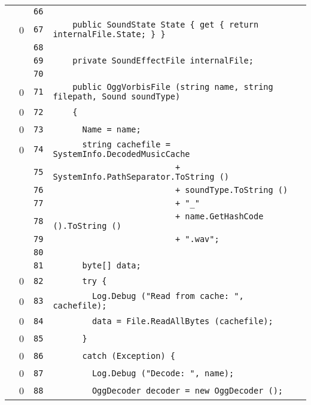 \documentclass[a4paper,10pt]{article}
\begin{document}
\begin{longtable}[l]{lrrl}
\cellcolor{gray} &  & \verb~66~ & \verb~~\\
\cellcolor{red} & 0 & \verb~67~ & \verb~    public SoundState State { get { return internalFile.State; } }~\\
\cellcolor{gray} &  & \verb~68~ & \verb~~\\
\cellcolor{gray} &  & \verb~69~ & \verb~    private SoundEffectFile internalFile;~\\
\cellcolor{gray} &  & \verb~70~ & \verb~~\\
\cellcolor{red} & 0 & \verb~71~ & \verb~    public OggVorbisFile (string name, string filepath, Sound soundType)~\\
\cellcolor{red} & 0 & \verb~72~ & \verb~    {~\\
\cellcolor{red} & 0 & \verb~73~ & \verb~      Name = name;~\\
\cellcolor{red} & 0 & \verb~74~ & \verb~      string cachefile = SystemInfo.DecodedMusicCache~\\
\cellcolor{gray} &  & \verb~75~ & \verb~                         + SystemInfo.PathSeparator.ToString ()~\\
\cellcolor{gray} &  & \verb~76~ & \verb~                         + soundType.ToString ()~\\
\cellcolor{gray} &  & \verb~77~ & \verb~                         + "_"~\\
\cellcolor{gray} &  & \verb~78~ & \verb~                         + name.GetHashCode ().ToString ()~\\
\cellcolor{gray} &  & \verb~79~ & \verb~                         + ".wav";~\\
\cellcolor{gray} &  & \verb~80~ & \verb~~\\
\cellcolor{gray} &  & \verb~81~ & \verb~      byte[] data;~\\
\cellcolor{red} & 0 & \verb~82~ & \verb~      try {~\\
\cellcolor{red} & 0 & \verb~83~ & \verb~        Log.Debug ("Read from cache: ", cachefile);~\\
\cellcolor{red} & 0 & \verb~84~ & \verb~        data = File.ReadAllBytes (cachefile);~\\
\cellcolor{red} & 0 & \verb~85~ & \verb~      }~\\
\cellcolor{red} & 0 & \verb~86~ & \verb~      catch (Exception) {~\\
\cellcolor{red} & 0 & \verb~87~ & \verb~        Log.Debug ("Decode: ", name);~\\
\cellcolor{red} & 0 & \verb~88~ & \verb~        OggDecoder decoder = new OggDecoder ();~\\

\end{longtable}
\end{document}

